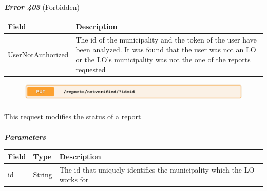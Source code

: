 						\paragraph{}
							\textcolor{myRed}{\textit{\textbf{Error 403}}} (Forbidden)
							\vspace{-2mm}
							\begin{table}[!h]
								\begin{tabular}{L{0.3\textwidth}L{0.62\textwidth}}
									\toprule
									\textbf{Field} & \textbf{Description} \\
									\midrule
								  	UserNotAuthorized & The id of the municipality and the token of the user have been analyzed. It was found that the user was not an LO or the LO's municipality was not the one of the reports requested \\
								 	\bottomrule
								\end{tabular}
							\end{table}
							
							\clearpage
							\begin{figure}[!h]
								\includegraphics[width=\textwidth]{images/Restful/ValidateReport}
							\end{figure}
						\paragraph{}
						\vspace{-7.5mm}
						This request modifies the status of a report
						\paragraph{}
							\textcolor{myBlue}{\textit{\textbf{Parameters}}}
							\vspace{-2mm}
							\begin{table}[!h]
								\begin{tabular}{L{0.15\textwidth}L{0.15\textwidth}L{0.58\textwidth}}
									\toprule
									\textbf{Field} & \textbf{Type} & \textbf{Description} \\
									\midrule
								 	id & String & The id that uniquely identifies the municipality which the LO works for \\
								 	\bottomrule
								\end{tabular}
							\end{table}
						\vspace{-5mm}
